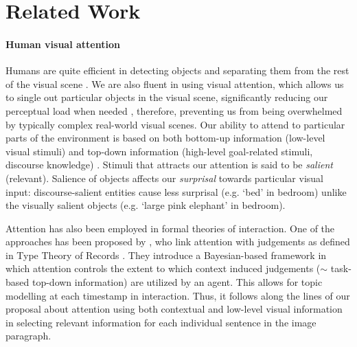 \documentclass[11pt,a4paper]{article}
\begin{document}

\section{Related Work}

\paragraph{Human visual attention}
Humans are quite efficient in detecting objects and separating them from the rest of the visual scene \cite{Ullman87}. We are also fluent in using visual attention, which allows us to single out particular objects in the visual scene, significantly reducing our perceptual load when needed \cite{Lavie04}, therefore, preventing us from being overwhelmed by typically complex real-world visual scenes.
Our ability to attend to particular parts of the environment is based on both bottom-up information (low-level visual stimuli) and top-down information (high-level goal-related stimuli, discourse knowledge) \cite{Zarcone2016}. %
Stimuli that attracts our attention is said to be \textit{salient} (relevant). Salience of objects affects our \textit{surprisal} towards particular visual input: discourse-salient entities cause less surprisal (e.g. `bed' in bedroom) unlike the visually salient objects (e.g. `large pink elephant' in bedroom).

Attention has also been employed in formal theories of interaction. One of the approaches has been proposed by , who link attention with judgements as defined in Type Theory of Records \cite{Cooper08typetheory}.
They introduce a Bayesian-based framework in which attention controls the extent to which context induced judgements ($\sim$ task-based top-down information) are utilized by an agent. This allows for topic modelling at each timestamp in interaction.  Thus, it follows along the lines of our proposal about attention using both contextual and low-level visual information in selecting relevant information for each individual sentence in the image paragraph.

\end{document}
